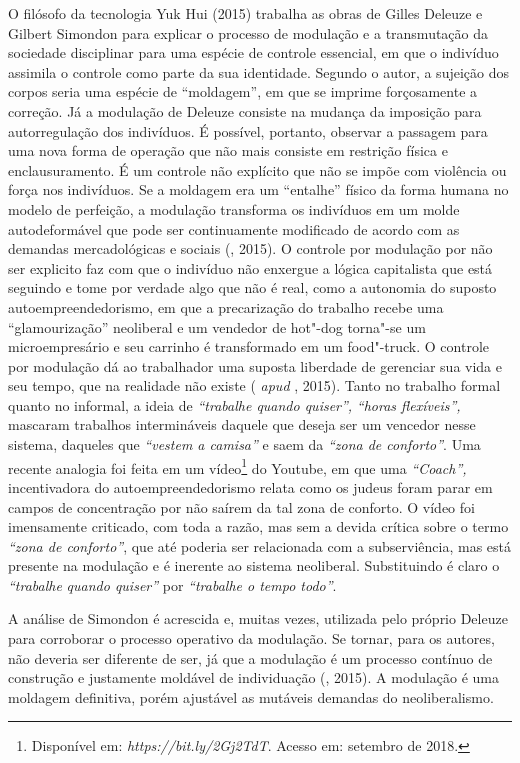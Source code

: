 O filósofo da tecnologia Yuk Hui (2015) trabalha as obras de Gilles
Deleuze e Gilbert Simondon para explicar o processo de modulação e a
transmutação da sociedade disciplinar para uma espécie de controle
essencial, em que o indivíduo assimila o controle como parte da sua
identidade. Segundo o autor, a sujeição dos corpos seria uma espécie de
``moldagem'', em que se imprime forçosamente a correção. Já a modulação
de Deleuze consiste na mudança da imposição para autorregulação dos
indivíduos. É possível, portanto, observar a passagem para uma nova
forma de operação que não mais consiste em restrição física e
enclausuramento. É um controle não explícito que não se impõe com
violência ou força nos indivíduos. Se a moldagem era um ``entalhe''
físico da forma humana no modelo de perfeição, a modulação transforma os
indivíduos em um molde autodeformável que pode ser continuamente
modificado de acordo com as demandas mercadológicas e sociais (,
2015). O controle por modulação por não ser explicito faz com que o
indivíduo não enxergue a lógica capitalista que está seguindo e tome por
verdade algo que não é real, como a autonomia do suposto
autoempreendedorismo, em que a precarização do trabalho recebe uma
``glamourização'' neoliberal e um vendedor de hot"-dog torna"-se um
microempresário e seu carrinho é transformado em um food"-truck. O
controle por modulação dá ao trabalhador uma suposta liberdade de
gerenciar sua vida e seu tempo, que na realidade não existe ( \emph{apud} , 2015). Tanto no trabalho formal quanto no
informal, a ideia de \emph{``trabalhe quando quiser'',} \emph{``horas
flexíveis'',} mascaram trabalhos intermináveis daquele que deseja ser um
vencedor nesse sistema, daqueles que \emph{``vestem a camisa''} e saem
da \emph{``zona de conforto''}. Uma recente analogia foi feita em um
vídeo\footnote{Disponível em: \emph{https://bit.ly/2Gj2TdT}.
  Acesso em: setembro de 2018.} do Youtube, em que uma \emph{``Coach'',}
incentivadora do autoempreendedorismo relata como os judeus foram parar
em campos de concentração por não saírem da tal zona de conforto. O
vídeo foi imensamente criticado, com toda a razão, mas sem a devida
crítica sobre o termo \emph{``zona de conforto''}, que até poderia ser
relacionada com a subserviência, mas está presente na modulação e é
inerente ao sistema neoliberal. Substituindo é claro o \emph{``trabalhe}
\emph{quando quiser''} por \emph{``trabalhe o tempo todo''}.

A análise de Simondon é acrescida e, muitas vezes, utilizada pelo
próprio Deleuze para corroborar o processo operativo da modulação. Se
tornar, para os autores, não deveria ser diferente de ser, já que a
modulação é um processo contínuo de construção e justamente moldável de
individuação (, 2015). A modulação é uma moldagem definitiva,
porém ajustável as mutáveis demandas do neoliberalismo.

